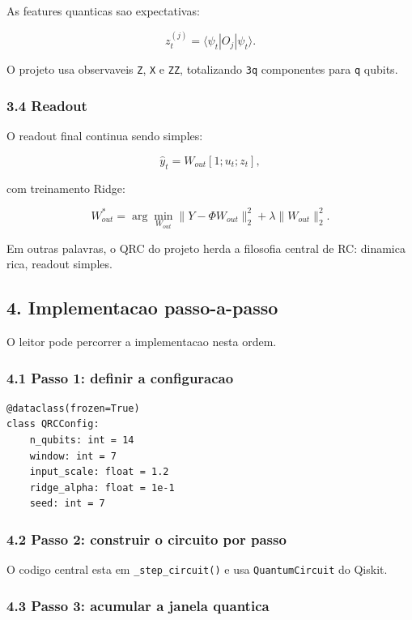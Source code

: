 \documentclass[12pt]{article}
\begin{document}
As features quanticas sao expectativas:

\[
z_t^{(j)} = \langle \psi_t | O_j | \psi_t \rangle.
\]

O projeto usa observaveis \texttt{Z}, \texttt{X} e \texttt{ZZ}, totalizando \texttt{3q} componentes para \texttt{q} qubits.

\subsubsection{3.4 Readout}\label{34-readout}

O readout final continua sendo simples:

\[
\hat{y}_t = W_{out} [1; u_t; z_t],
\]

com treinamento Ridge:

\[
W_{out}^* = \arg\min_{W_{out}} \|Y - \Phi W_{out}\|_2^2 + \lambda \|W_{out}\|_2^2.
\]

Em outras palavras, o QRC do projeto herda a filosofia central de RC: dinamica rica, readout simples.

\subsection{4. Implementacao passo-a-passo}\label{4-implementacao-passo-a-passo}

O leitor pode percorrer a implementacao nesta ordem.

\subsubsection{4.1 Passo 1: definir a configuracao}\label{41-passo-1-definir-a-configuracao}

\begin{verbatim}
@dataclass(frozen=True)
class QRCConfig:
    n_qubits: int = 14
    window: int = 7
    input_scale: float = 1.2
    ridge_alpha: float = 1e-1
    seed: int = 7
\end{verbatim}

\subsubsection{4.2 Passo 2: construir o circuito por passo}\label{42-passo-2-construir-o-circuito-por-passo}

O codigo central esta em \texttt{\_step\_circuit()} e usa \texttt{QuantumCircuit} do Qiskit.

\subsubsection{4.3 Passo 3: acumular a janela quantica}\label{43-passo-3-acumular-a-janela-quantica}
\end{document}
